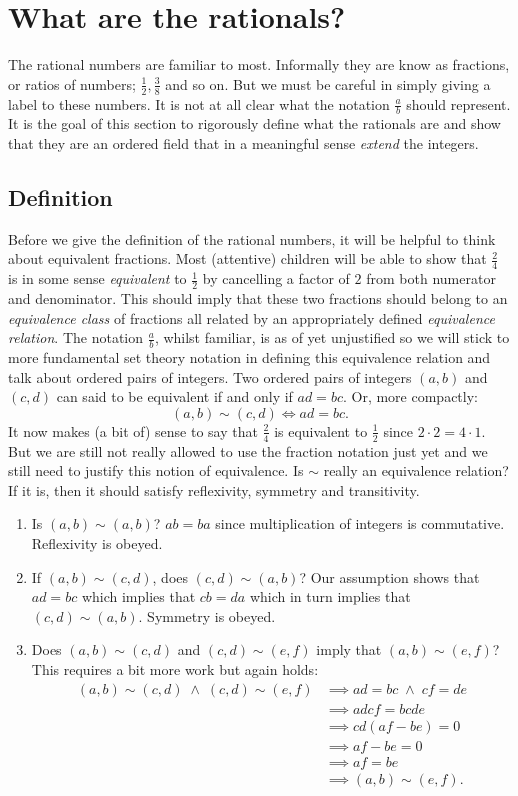 \documentclass[]{scrartcl}
\theoremstyle{definition}
\newcommand{\AND}{\;\wedge\;}
\begin{document}
\section{What are the rationals?}
The rational numbers are familiar to most. Informally they are know as fractions, or ratios of numbers; $\frac{1}{2}, \frac{3}{8}$ and so on. But we must be careful in simply giving a label to these numbers. It is not at all clear what the notation $\frac{a}{b}$ should represent. It is the goal of this section to rigorously define what the rationals are and show that they are an ordered field that in a meaningful sense \textit{extend} the integers.

\subsection{Definition}
Before we give the definition of the rational numbers, it will be helpful to think about equivalent fractions. Most (attentive) children will be able to show that $\frac{2}{4}$ is in some sense \textit{equivalent} to $\frac{1}{2}$ by cancelling a factor of $2$ from both numerator and denominator. This should imply that these two fractions should belong to an \textit{equivalence class} of fractions all related by an appropriately defined \textit{equivalence relation}. The notation $\frac{a}{b}$, whilst familiar, is as of yet unjustified so we will stick to more fundamental set theory notation in defining this equivalence relation and talk about ordered pairs of integers. Two ordered pairs of integers $(a, b)$ and $(c, d)$ can said to be equivalent if and only if $ad=bc$. Or, more compactly:
$$
(a,b) \sim (c,d) \iff ad=bc.
$$
It now makes (a bit of) sense to say that $\frac{2}{4}$ is equivalent to $\frac{1}{2}$ since $2\cdot2 = 4\cdot1$. But we are still not really allowed to use the fraction notation just yet and we still need to justify this notion of equivalence. Is $\sim$ really an equivalence relation? If it is, then it should satisfy reflexivity, symmetry and transitivity.
\begin{enumerate}
    \item Is $(a,b)\sim(a,b)$? $ab=ba$ since multiplication of integers is commutative. Reflexivity is obeyed.
    \item If $(a,b) \sim (c,d)$, does $(c,d) \sim (a,b)$? Our assumption shows that $ad = bc$ which implies that $cb = da$ which in turn implies that $(c,d) \sim (a,b)$. Symmetry is obeyed.
    \item Does $(a,b) \sim (c, d)$ and $(c,d) \sim (e,f)$ imply that $(a,b)\sim(e,f)$? This requires a bit more work but again holds:
    \begin{align*}
        (a, b) \sim (c,d) \AND (c,d) \sim (e,f) &\implies ad=bc \AND cf=de \\
        &\implies adcf=bcde \\
        &\implies cd(af - be) = 0 \\
        &\implies af - be = 0 \\
        &\implies af = be \\
        &\implies (a,b) \sim (e,f).
    \end{align*}
\end{enumerate}
\end{document}
